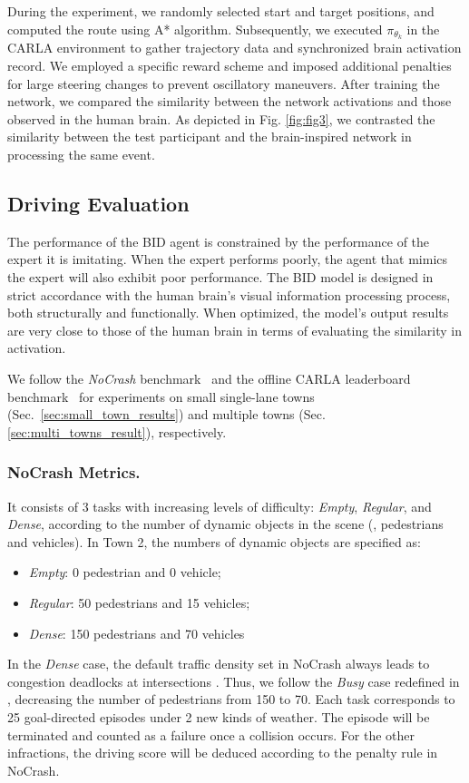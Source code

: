 During the experiment, we randomly selected start and target positions, and computed the route using A* algorithm. Subsequently, we executed $\pi_{\theta_{k}}$ in the CARLA \cite{Dosovitskiy17} environment to gather trajectory data and synchronized brain activation record. We employed a specific reward scheme and imposed additional penalties for large steering changes to prevent oscillatory maneuvers. After training the network, we compared the similarity between the network activations and those observed in the human brain. As depicted in Fig. \ref{fig:fig3}, we contrasted the similarity between the test participant and the brain-inspired network in processing the same event.


\subsection{Driving Evaluation}
\label{sec:Metrics}
The performance of the BID agent is constrained by the performance of the expert it is imitating. 
When the expert performs poorly, the agent that mimics the expert will also exhibit poor performance. 
The BID model is designed in strict accordance with the human brain's visual information processing process, both structurally and functionally. 
When optimized, the model's output results are very close to those of the human brain in terms of evaluating the similarity in activation.


We follow the \emph{NoCrash} benchmark~\cite{Codevilla:2019} and the offline CARLA leaderboard benchmark~\cite{Zhang:2021,Hu:2022} for experiments on small single-lane towns (Sec.~\ref{sec:small_town_results}) and multiple towns (Sec.~ \ref{sec:multi_towns_result}), respectively.


\subsubsection{NoCrash Metrics.}\label{nocrash_metrics}
It consists of 3 tasks with increasing levels of difficulty: \emph{Empty}, \emph{Regular}, and \emph{Dense}, according to the number of dynamic objects in the scene ({\ie}, pedestrians and vehicles). 
In Town 2, the numbers of dynamic objects are specified as:
\begin{itemize}
	\item \emph{Empty}: 0 pedestrian and 0 vehicle;
	\item \emph{Regular}: 50 pedestrians and 15 vehicles;
	\item \emph{Dense}: 150 pedestrians and 70 vehicles
\end{itemize}
In the \emph{Dense} case, the default traffic density set in NoCrash always leads to congestion deadlocks at intersections \cite{Zhang:2021}. 
Thus, we follow the \emph{Busy} case redefined in \cite{Zhang:2021}, decreasing the number of pedestrians from 150 to 70. 
Each task corresponds to 25 goal-directed episodes under 2 new kinds of weather.
The episode will be terminated and counted as a failure once a collision occurs. 
For the other infractions, the driving score will be deduced according to the penalty rule in NoCrash. 


